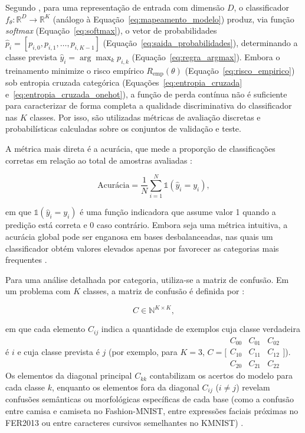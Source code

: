 \documentclass[
    12pt,
    openright,
    oneside,
    a4paper,
    english,
    brazil
]{abntex2}
\begin{document}
Segundo , para uma representação de entrada com dimensão \(D\), o classificador \(f_{\theta}: \mathbb{R}^{D} \rightarrow \mathbb{R}^{K}\) (análogo à Equação~\eqref{eq:mapeamento_modelo}) produz, via função \textit{softmax} (Equação~\eqref{eq:softmax}), o vetor de probabilidades \(\hat{p}_i = [p_{i,0}, p_{i,1}, \ldots, p_{i,K-1}]\) (Equação~\eqref{eq:saida_probabilidades}), determinando a classe prevista \(\hat{y}_i = \arg\max_{k} p_{i,k}\) (Equação~\eqref{eq:regra_argmax}). Embora o treinamento minimize o risco empírico \(R_{\text{emp}}(\theta)\) (Equação~\eqref{eq:risco_empirico}) sob entropia cruzada categórica (Equações~\eqref{eq:entropia_cruzada} e~\eqref{eq:entropia_cruzada_onehot}), a função de perda contínua não é suficiente para caracterizar de forma completa a qualidade discriminativa do classificador nas \(K\) classes. Por isso, são utilizadas métricas de avaliação discretas e probabilísticas calculadas sobre os conjuntos de validação e teste.

A métrica mais direta é a acurácia, que mede a proporção de classificações corretas em relação ao total de amostras avaliadas \cite{johnson2019survey,sokolova2009systematic}:

\begin{equation}
\label{eq:acuracia}
\text{Acurácia} =
\frac{1}{N}
\sum_{i=1}^{N}
\mathbb{1}(\hat{y}_i = y_i),
\end{equation}

em que \(\mathbb{1}(\hat{y}_i = y_i)\) é uma função indicadora que assume valor 1 quando a predição está correta e 0 caso contrário. Embora seja uma métrica intuitiva, a acurácia global pode ser enganosa em bases desbalanceadas, nas quais um classificador obtém valores elevados apenas por favorecer as categorias mais frequentes \cite{fawcett2006roc,johnson2019survey}.

Para uma análise detalhada por categoria, utiliza-se a matriz de confusão. Em um problema com \(K\) classes, a matriz de confusão é definida por \cite{fawcett2006roc,sokolova2009systematic}:

\begin{equation}
\label{eq:matriz_confusao}
C \in \mathbb{N}^{K \times K},
\end{equation}

em que cada elemento \(C_{ij}\) indica a quantidade de exemplos cuja classe verdadeira é \(i\) e cuja classe prevista é \(j\) (por exemplo, para \(K=3\), \(C = \bigl[\begin{smallmatrix} C_{00} & C_{01} & C_{02} \\ C_{10} & C_{11} & C_{12} \\ C_{20} & C_{21} & C_{22} \end{smallmatrix}\bigr]\)). Os elementos da diagonal principal \(C_{kk}\) contabilizam os acertos do modelo para cada classe \(k\), enquanto os elementos fora da diagonal \(C_{ij}\) (\(i \neq j\)) revelam confusões semânticas ou morfológicas específicas de cada base (como a confusão entre camisa e camiseta no Fashion-MNIST, entre expressões faciais próximas no FER2013 ou entre caracteres cursivos semelhantes no KMNIST) \cite{fawcett2006roc,sokolova2009systematic}.
\end{document}
